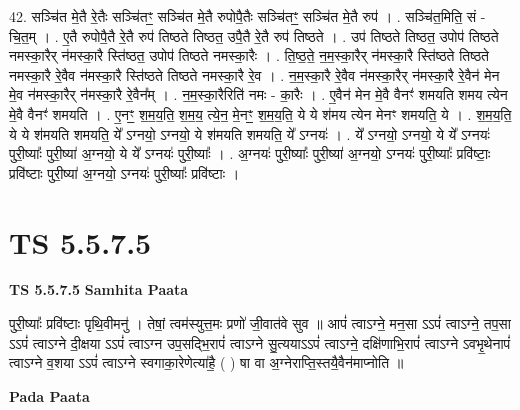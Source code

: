 \documentclass[17pt]{extarticle}
\begin{document}
42. सञ्चि॑त मे॒तै रे॒तैः सञ्चि॑तꣳ॒॒ सञ्चि॑त मे॒तै रुपोपै॒तैः सञ्चि॑तꣳ॒॒ सञ्चि॑त मे॒तै रुप॑ । . सञ्चि॑त॒मिति॒ सं - चि॒त॒म् । . ए॒तै रुपोपै॒तै रे॒तै रुप॑ तिष्ठते तिष्ठत॒ उपै॒तै रे॒तै रुप॑ तिष्ठते । . उप॑ तिष्ठते तिष्ठत॒ उपोप॑ तिष्ठते नमस्का॒रैर् न॑मस्का॒रै स्ति॑ष्ठत॒ उपोप॑ तिष्ठते नमस्का॒रैः । . ति॒ष्ठ॒ते॒ न॒म॒स्का॒रैर् न॑मस्का॒रै स्ति॑ष्ठते तिष्ठते नमस्का॒रै रे॒वैव न॑मस्का॒रै स्ति॑ष्ठते तिष्ठते नमस्का॒रै रे॒व । . न॒म॒स्का॒रै रे॒वैव न॑मस्का॒रैर् न॑मस्का॒रै रे॒वैन॑ मेन मे॒व न॑मस्का॒रैर् न॑मस्का॒रै रे॒वैन᳚म् । . न॒म॒स्का॒रैरिति॑ नमः - का॒रैः । . ए॒वैन॑ मेन मे॒वै वैनꣳ॑ शमयति शमय त्येन मे॒वै वैनꣳ॑ शमयति । . ए॒नꣳ॒॒ श॒म॒य॒ति॒ श॒म॒य॒ त्ये॒न॒ मे॒नꣳ॒॒ श॒म॒य॒ति॒ ये ये श॑मय त्येन मेनꣳ शमयति॒ ये । . श॒म॒य॒ति॒ ये ये श॑मयति शमयति॒ ये᳚ ऽग्नयो॒ ऽग्नयो॒ ये श॑मयति शमयति॒ ये᳚ ऽग्नयः॑ । . ये᳚ ऽग्नयो॒ ऽग्नयो॒ ये ये᳚ ऽग्नयः॑ पुरी॒ष्याः᳚ पुरी॒ष्या॑ अ॒ग्नयो॒ ये ये᳚ ऽग्नयः॑ पुरी॒ष्याः᳚ । . अ॒ग्नयः॑ पुरी॒ष्याः᳚ पुरी॒ष्या॑ अ॒ग्नयो॒ ऽग्नयः॑ पुरी॒ष्याः᳚ प्रवि॑ष्टाः॒ प्रवि॑ष्टाः पुरी॒ष्या॑ अ॒ग्नयो॒ ऽग्नयः॑ पुरी॒ष्याः᳚ प्रवि॑ष्टाः । \newline
\pagebreak
{}

\section{ TS 5.5.7.5 }

\textbf{TS 5.5.7.5 } \newline
\textbf{Samhita Paata} \newline

पुरी॒ष्याः᳚ प्रवि॑ष्टाः पृथि॒वीमनु॑ । तेषां॒ त्वम॑स्युत्त॒मः प्रणो॑ जी॒वात॑वे सुव ॥ आपं॑ त्वाऽग्ने॒ मन॒सा ऽऽपं॑ त्वाऽग्ने॒ तप॒सा ऽऽपं॑ त्वाऽग्ने दी॒क्षया ऽऽपं॑ त्वाऽग्न उप॒सद्भि॒रापं॑ त्वाऽग्ने सु॒त्ययाऽऽपं॑ त्वाऽग्ने॒ दक्षि॑णाभि॒रापं॑ त्वाऽग्ने ऽवभृ॒थेनापं॑ त्वाऽग्ने व॒शया ऽऽपं॑ त्वाऽग्ने स्वगाका॒रेणेत्या॑है॒ ( ) षा वा अ॒ग्नेराप्ति॒स्तयै॒वैन॑माप्नोति ॥ \newline

\textbf{Pada Paata} \newline
\end{document}
